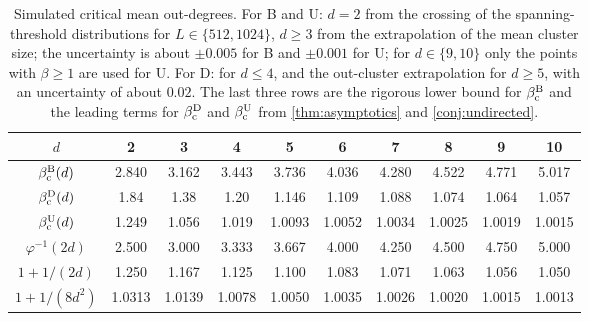 \begin{table}[ht]
\centering
\renewcommand{\arraystretch}{1.15}
\begin{tabular}{cccccccccc}
\toprule
$d$ & 2 & 3 & 4 & 5 & 6 & 7 & 8 & 9 & 10\\
\midrule
$\beta_{\mathrm c}^{\mathrm B}(d)$ & 2.840 & 3.162 & 3.443 & 3.736 & 4.036 & 4.280 & 4.522 & 4.771 & 5.017\\
$\beta_{\mathrm c}^{\mathrm D}(d)$ & 1.84 & 1.38 & 1.20 & 1.146 & 1.109 & 1.088 & 1.074 & 1.064 & 1.057\\
$\beta_{\mathrm c}^{\mathrm U}(d)$ & 1.249 & 1.056 & 1.019 & 1.0093 & 1.0052 & 1.0034 & 1.0025 & 1.0019 & 1.0015\\
\midrule
$\varphi^{-1}(2d)$ & 2.500 & 3.000 & 3.333 & 3.667 & 4.000 & 4.250 & 4.500 & 4.750 & 5.000\\
$1+1/(2d)$ & 1.250 & 1.167 & 1.125 & 1.100 & 1.083 & 1.071 & 1.063 & 1.056 & 1.050\\
$1+1/(8d^2)$ & 1.0313 & 1.0139 & 1.0078 & 1.0050 & 1.0035 & 1.0026 & 1.0020 & 1.0015 & 1.0013\\
\bottomrule
\end{tabular}
\caption{Simulated critical mean out-degrees. For B and U: $d=2$ from the crossing of the spanning-threshold distributions for $L\in\{512,1024\}$, $d\ge3$ from the extrapolation of the mean cluster size; the uncertainty is about $\pm0.005$ for B and $\pm0.001$ for U; for $d\in\{9,10\}$ only the points with $\beta\ge1$ are used for U. For D: \cite[Table~1]{CHJK26} for $d\le4$, and the out-cluster extrapolation for $d\ge5$, with an uncertainty of about $0.02$. The last three rows are the rigorous lower bound for $\beta_{\mathrm c}^{\mathrm B}$ and the leading terms for $\beta_{\mathrm c}^{\mathrm D}$ and $\beta_{\mathrm c}^{\mathrm U}$ from \cref{thm:asymptotics} and \cref{conj:undirected}.}\label{tab:sim}
\end{table}
